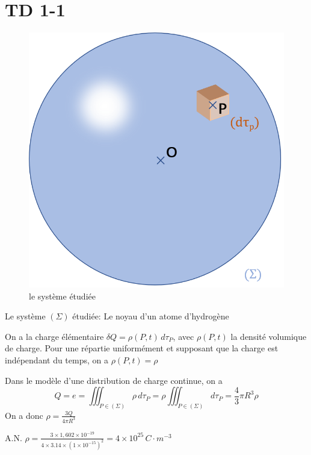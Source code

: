 \documentclass[a4paper,12pt]{book}
\begin{document}
\renewcommand{\labelitemi}{$\blacktriangleright$}
\renewcommand{\labelitemii}{$\bullet$}


\section{TD 1-1}
\begin{figure}[h]
    \begin{center}
    \includegraphics[scale=0.6]{elec11.png}
    \end{center}
    \caption{le système étudiée}
\end{figure}
Le système $(\Sigma)$ étudiée: Le noyau d'un atome d'hydrogène

On a la charge élémentaire $\delta Q=\rho(P,t)\,d\tau_P$, avec $\rho(P,t)$ la densité volumique de charge.
Pour une répartie uniformément et supposant que la charge est indépendant du temps, on a $\rho(P,t)=\rho$

Dans le modèle d'une distribution de charge continue, on a 
$$
Q=e=\iiint_{P \in (\Sigma)} \rho\,d\tau_P=\rho\iiint_{P \in (\Sigma)}d\tau_P=\frac{4}{3}\pi R^3\rho
$$
On a donc $\boxed{\rho=\frac{3Q}{4\pi R^3}}$

A.N. $\boxed{\rho=\frac{3\times 1,602\times10^{-19}}{4 \times 3.14\times (1\times 10^{-15})^2}=4\times 10^{25}\,C\cdot m^{-3}}$
\end{document}
